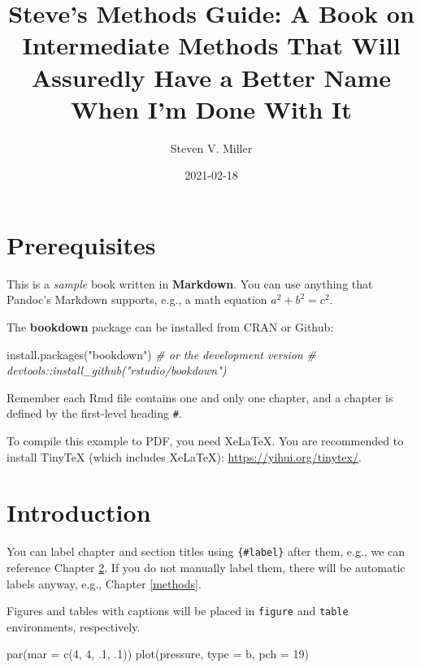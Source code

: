 \documentclass[
]{book}
\title{Steve's Methods Guide: A Book on Intermediate Methods That Will Assuredly Have a Better Name When I'm Done With It}
\author{Steven V. Miller}
\date{2021-02-18}
\newenvironment{Shaded}{\begin{snugshade}}{\end{snugshade}}
\newcommand{\AttributeTok}[1]{\textcolor[rgb]{0.77,0.63,0.00}{#1}}
\newcommand{\CommentTok}[1]{\textcolor[rgb]{0.56,0.35,0.01}{\textit{#1}}}
\newcommand{\DecValTok}[1]{\textcolor[rgb]{0.00,0.00,0.81}{#1}}
\newcommand{\FunctionTok}[1]{\textcolor[rgb]{0.00,0.00,0.00}{#1}}
\newcommand{\NormalTok}[1]{#1}
\newcommand{\StringTok}[1]{\textcolor[rgb]{0.31,0.60,0.02}{#1}}
\begin{document}
\maketitle

{
\setcounter{tocdepth}{1}
\tableofcontents
}
\hypertarget{prerequisites}{%
\chapter{Prerequisites}\label{prerequisites}}

This is a \emph{sample} book written in \textbf{Markdown}. You can use anything that Pandoc's Markdown supports, e.g., a math equation \(a^2 + b^2 = c^2\).

The \textbf{bookdown} package can be installed from CRAN or Github:

\begin{Shaded}
\begin{Highlighting}[]
\FunctionTok{install.packages}\NormalTok{(}\StringTok{"bookdown"}\NormalTok{)}
\CommentTok{\# or the development version}
\CommentTok{\# devtools::install\_github("rstudio/bookdown")}
\end{Highlighting}
\end{Shaded}

Remember each Rmd file contains one and only one chapter, and a chapter is defined by the first-level heading \texttt{\#}.

To compile this example to PDF, you need XeLaTeX. You are recommended to install TinyTeX (which includes XeLaTeX): \url{https://yihui.org/tinytex/}.

\hypertarget{intro}{%
\chapter{Introduction}\label{intro}}

You can label chapter and section titles using \texttt{\{\#label\}} after them, e.g., we can reference Chapter \ref{intro}. If you do not manually label them, there will be automatic labels anyway, e.g., Chapter \ref{methods}.

Figures and tables with captions will be placed in \texttt{figure} and \texttt{table} environments, respectively.

\begin{Shaded}
\begin{Highlighting}[]
\FunctionTok{par}\NormalTok{(}\AttributeTok{mar =} \FunctionTok{c}\NormalTok{(}\DecValTok{4}\NormalTok{, }\DecValTok{4}\NormalTok{, .}\DecValTok{1}\NormalTok{, .}\DecValTok{1}\NormalTok{))}
\FunctionTok{plot}\NormalTok{(pressure, }\AttributeTok{type =} \StringTok{\textquotesingle{}b\textquotesingle{}}\NormalTok{, }\AttributeTok{pch =} \DecValTok{19}\NormalTok{)}
\end{Highlighting}
\end{Shaded}
\end{document}
